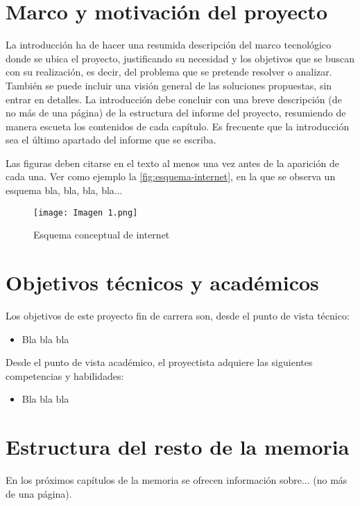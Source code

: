 \section{Marco y motivación del proyecto}

\noindent La introducción ha de hacer una resumida descripción del marco tecnológico donde se ubica el proyecto, justificando su necesidad y los objetivos que se buscan con su realización, es decir, del problema que se pretende resolver o analizar. También se puede incluir una visión general de las soluciones propuestas, sin entrar en detalles. La introducción debe concluir con una breve descripción (de no más de una página) de la estructura del informe del proyecto, resumiendo de manera escueta los contenidos de cada capítulo. Es frecuente que la introducción sea el último apartado del informe que se escriba.

Las figuras deben citarse en el texto al menos una vez antes de la aparición de cada una. Ver como ejemplo la \autoref{fig:esquema-internet}, en la que se observa un esquema bla, bla, bla, bla...

\begin{figure}[H]
    \centering
    \texttt{[image: Imagen 1.png]}
    \caption{Esquema conceptual de internet}
    \label{fig:esquema-internet}
\end{figure}

\section{Objetivos técnicos y académicos}

\noindent Los objetivos de este proyecto fin de carrera son, desde el punto de vista técnico:

\begin{itemize}
    \item Bla bla bla
\end{itemize}

Desde el punto de vista académico, el proyectista adquiere las siguientes competencias y habilidades:

\begin{itemize}
    \item Bla bla bla
\end{itemize}

\section{Estructura del resto de la memoria}

\noindent En los próximos capítulos de la memoria se ofrecen información sobre... (no más de una página).